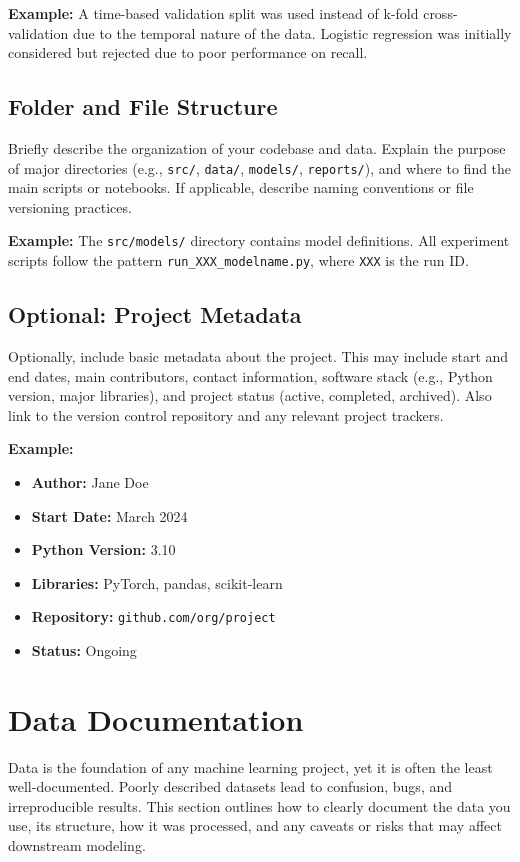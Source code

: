 \documentclass[12pt,openany]{book}
\begin{document}
\textbf{Example:} A time-based validation split was used instead of k-fold cross-validation due to the temporal nature of the data. Logistic regression was initially considered but rejected due to poor performance on recall.

\subsection{Folder and File Structure}

Briefly describe the organization of your codebase and data. Explain the purpose of major directories (e.g., \texttt{src/}, \texttt{data/}, \texttt{models/}, \texttt{reports/}), and where to find the main scripts or notebooks. If applicable, describe naming conventions or file versioning practices.

\textbf{Example:} The \texttt{src/models/} directory contains model definitions. All experiment scripts follow the pattern \texttt{run\_XXX\_modelname.py}, where \texttt{XXX} is the run ID.

\subsection{Optional: Project Metadata}

Optionally, include basic metadata about the project. This may include start and end dates, main contributors, contact information, software stack (e.g., Python version, major libraries), and project status (active, completed, archived). Also link to the version control repository and any relevant project trackers.

\textbf{Example:}
\begin{itemize}
    \item \textbf{Author:} Jane Doe
    \item \textbf{Start Date:} March 2024
    \item \textbf{Python Version:} 3.10
    \item \textbf{Libraries:} PyTorch, pandas, scikit-learn
    \item \textbf{Repository:} \texttt{github.com/org/project}
    \item \textbf{Status:} Ongoing
\end{itemize}


\section{Data Documentation}

Data is the foundation of any machine learning project, yet it is often the least well-documented. Poorly described datasets lead to confusion, bugs, and irreproducible results. This section outlines how to clearly document the data you use, its structure, how it was processed, and any caveats or risks that may affect downstream modeling.
\end{document}
